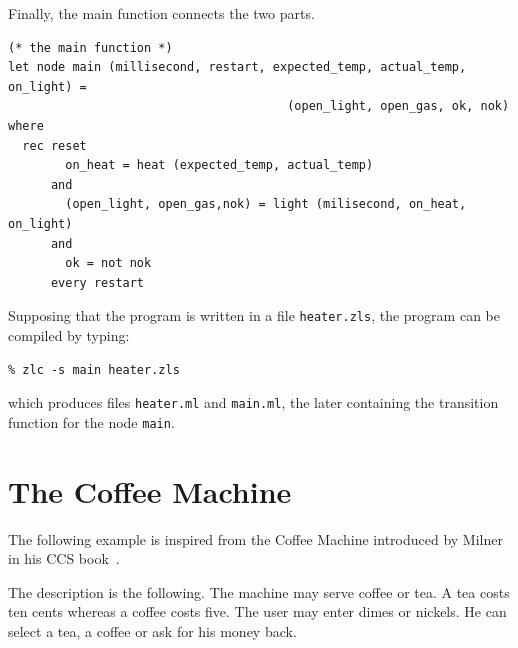 \documentclass[11pt,titlepage,twoside]{report}
\begin{document}
Finally, the main function connects the two parts.

\begin{verbatim}
(* the main function *)
let node main (millisecond, restart, expected_temp, actual_temp, on_light) =
                                       (open_light, open_gas, ok, nok) where
  rec reset
        on_heat = heat (expected_temp, actual_temp)
      and
        (open_light, open_gas,nok) = light (milisecond, on_heat, on_light)
      and
        ok = not nok       
      every restart
\end{verbatim}

Supposing that the program is written in a file \verb-heater.zls-, the
program can be compiled by typing:

\begin{verbatim}
% zlc -s main heater.zls
\end{verbatim}
which produces files \verb-heater.ml- and \verb-main.ml-, the later
containing the transition function for the node \verb-main-.
 
\section{The Coffee Machine}
The following example is inspired from the Coffee Machine introduced
by Milner in his CCS book~\cite{milner:ccs-book89}.

The description is the following. The machine may serve coffee or tea.
A tea costs ten cents whereas a coffee costs five. The user may enter
dimes or nickels. He can select a tea, a coffee or ask for his money back.
\end{document}
